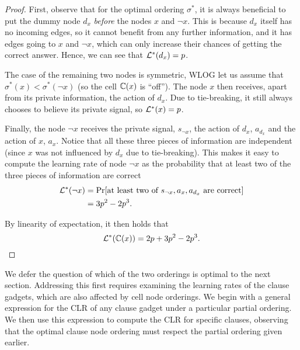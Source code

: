 \begin{proof}
    First, observe that for the optimal ordering $ \sigma^* $, it is always beneficial to put the dummy node $ d_x $ \emph{before} the nodes $ x $ and $ \lnot x $.
    This is because $ d_x $ itself has no incoming edges, so it cannot benefit from any further information, and it has edges going to $ x $ and $ \lnot x $, which can only increase their chances of getting the correct answer.
    Hence, we can see that $ \mathcal{L}^*(d_x) = p $.

    The case of the remaining two nodes is symmetric, WLOG let us assume that $ \sigma^*(x) < \sigma^*(\lnot x) $ (so the cell $ \mathbb{C}\!\left(x\right) $ is ``off'').
    The node $ x $ then receives, apart from its private information, the action of $ d_x $.
    Due to tie-breaking, it still always chooses to believe its private signal, so $ \mathcal{L}^* (x) = p $.

    Finally, the node $ \lnot x $ receives the private signal, $ s_{\lnot x} $, the action of $ d_x $, $ a_{d_x} $ and the action of $ x $, $ a_x $.
    Notice that all these three pieces of information are independent (since $ x $ was not influenced by $ d_x $ due to tie-breaking).
    This makes it easy to compute the learning rate of node $ \lnot x $ as the probability that at least two of the three pieces of information are correct \begin{align*}
        \mathcal{L}^*(\lnot x) &= \Pr\!\left[ \text{at least two of $ s_{\lnot x}, a_x, a_{d_x} $ are correct} \right] \\
        &= 3p^2 - 2p^3.
    \end{align*}

    By linearity of expectation, it then holds that \[
	\mathcal{L}^*(\mathbb{C}\!\left(x\right)) = 2p + 3p^2 -2p^3.
    \]
\end{proof}

We defer the question of which of the two orderings is optimal to the next section. Addressing this first requires examining the learning rates of the clause gadgets, which are also affected by cell node orderings. We begin with a general expression for the CLR of any clause gadget under a particular partial ordering. We then use this expression to compute the CLR for specific clauses, observing that the optimal clause node ordering must respect the partial ordering given earlier.

